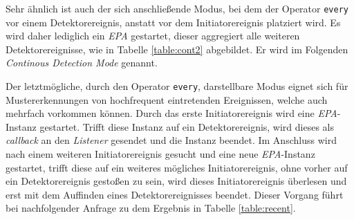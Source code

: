 \documentclass{acm_proc_article-sp}
\begin{document}
\begin{table}[ht]
    \caption{\textit{Continous Consumption Mode}}
    \label{table:cont}\vspace{0.2cm}
\end{table}

Sehr ähnlich ist auch der sich anschließende Modus, bei dem der Operator \texttt{every} 
vor einem Detektorereignis, anstatt vor dem Initiatorereignis platziert wird. Es wird 
daher lediglich ein \textit{EPA} gestartet, dieser aggregiert alle weiteren 
Detektorereignisse, wie in Tabelle \ref{table:cont2} abgebildet. Er wird im Folgenden 
\textit{Continous Detection Mode} genannt.

\begin{table}[ht]
    \caption{\textit{Continous Detection Mode}}
    \label{table:cont2}\vspace{0.2cm}
\end{table}

Der letztmögliche, durch den Operator \texttt{every}, darstellbare Modus eignet sich für 
Mustererkennungen von hochfrequent eintretenden 
Ereignissen, welche auch mehrfach vorkommen können. Durch das erste Initiatorereignis 
wird eine \textit{EPA}-Instanz gestartet. Trifft diese Instanz auf ein Detektorereignis, 
wird dieses als \textit{callback} an den \textit{Listener} gesendet und die Instanz 
beendet. Im Anschluss wird nach einem weiteren Initiatorereignis gesucht und eine neue 
\textit{EPA}-Instanz gestartet, trifft diese auf ein weiteres mögliches 
Initiatorereignis, ohne vorher auf ein Detektorereignis gestoßen zu sein, wird dieses
Initiatorereignis überlesen und erst mit dem Auffinden eines Detektorereignisses beendet. 
Dieser Vorgang führt bei nachfolgender Anfrage zu dem Ergebnis in Tabelle 
\ref{table:recent}.
\end{document}
